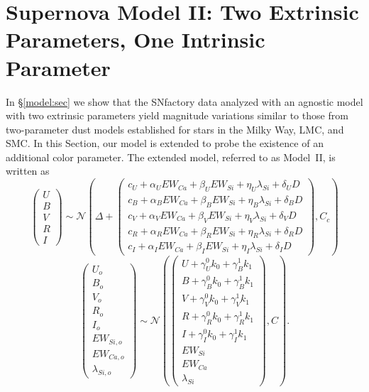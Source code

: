 \documentclass{aastex61}   	%
\begin{document}
\color{black}


\section{Supernova Model II: Two Extrinsic Parameters, One Intrinsic Parameter}
\label{model2:sec}
In \S\ref{model:sec} we show that the SNfactory data analyzed with an agnostic model with
two extrinsic parameters yield magnitude variations
similar
to those from  two-parameter dust models established for stars in the Milky Way, LMC, and SMC.
In this Section, our model is extended
to probe the existence of
an additional
color parameter.
The extended model, referred to as Model~II, is written as
\begin{equation}
\begin{pmatrix}
U\\B\\V\\R\\I
\end{pmatrix}
\sim \mathcal{N}
\left(
\Delta +
\begin{pmatrix}
c_U+\alpha_U EW_{Ca} + \beta_U EW_{Si} + \eta_U \lambda_{Si} + \delta_U D\\
c_B+\alpha_B EW_{Ca} + \beta_B EW_{Si} + \eta_B \lambda_{Si} + \delta_B D \\
c_V+\alpha_V EW_{Ca} + \beta_V EW_{Si} + \eta_V \lambda_{Si} + \delta_V D\\
c_R+\alpha_R EW_{Ca} + \beta_R EW_{Si} + \eta_R \lambda_{Si} + \delta_R D\\
c_I+\alpha_I EW_{Ca} + \beta_I EW_{Si}+ \eta_I \lambda_{Si} + \delta_I D
\end{pmatrix}
,C_{c}
\right)
\label{ewsiv2:eqn}
\end{equation}
\begin{equation}
\begin{pmatrix}
U_o\\B_o\\ V_o\\R_o\\I_o\\EW_{Si, o}\\ EW_{Ca, o} \\ \lambda_{Si, o}
\end{pmatrix}
\sim \mathcal{N}
\left(
\begin{pmatrix}
U +\gamma^0_{U} k_0 +\gamma^1_{B} k_1 \\B +\gamma^0_{B} k_0 +\gamma^1_{B} k_1 \\
V+\gamma^0_{V} k_0+\gamma^1_{V} k_1\\R+\gamma^0_{R} k_0 + \gamma^1_{R} k_1\\I+\gamma^0_{I} k_0+\gamma^1_{I} k_1\\
EW_{Si}\\ EW_{Ca} \\ \lambda_{Si}
\end{pmatrix}
,C
\right).
\label{dust2:eqn}
\end{equation}
\end{document}
